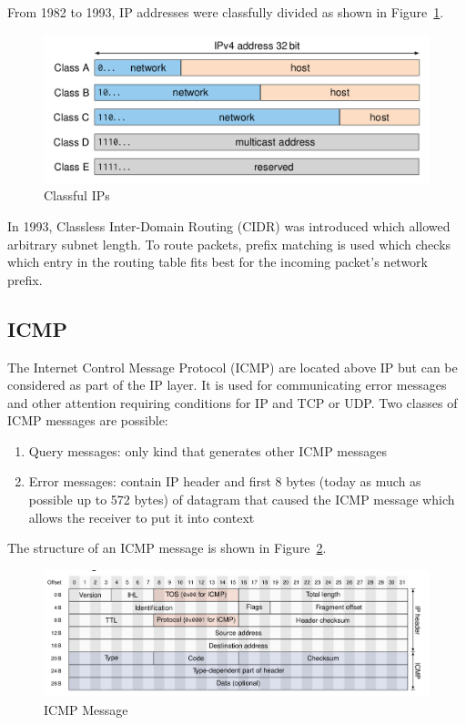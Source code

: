 From 1982 to 1993, IP addresses were classfully divided as shown in Figure~\ref{fig:classful_ips}.
\begin{figure}[h]
  \centering
  \includegraphics[width=.8\textwidth]{figures/classful_ip.png}
  \caption{Classful IPs}\label{fig:classful_ips}
\end{figure}
In 1993, Classless Inter-Domain Routing (CIDR) was introduced which allowed arbitrary subnet length.
To route packets, prefix matching is used which checks which entry in the routing table fits best for the incoming packet's network prefix.

\subsection{ICMP}
The Internet Control Message Protocol (ICMP) are located above IP but can be considered as part of the IP layer.
It is used for communicating error messages and other attention requiring conditions for IP and TCP or UDP\@.
Two classes of ICMP messages are possible:
\begin{enumerate}
  \item Query messages: only kind that generates other ICMP messages
  \item Error messages: contain IP header and first 8 bytes (today as much as possible up to 572 bytes) of datagram that caused the ICMP message which allows the receiver to put it into context
\end{enumerate}
The structure of an ICMP message is shown in Figure~\ref{fig:icmp_message}.
\begin{figure}[H]
  \centering
  \includegraphics[width=.8\textwidth]{figures/icmp_message.png}
  \caption{ICMP Message}\label{fig:icmp_message}
\end{figure}

